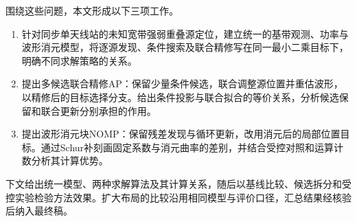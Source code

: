 围绕这些问题，本文形成以下三项工作。
\begin{enumerate}
  \item 针对同步单天线站的未知宽带强弱重叠源定位，建立统一的基带观测、功率与波形消元模型，将逐源发现、条件搜索及联合精修写在同一最小二乘目标下，明确不同求解策略的关系。
  \item 提出多候选联合精修AP：保留少量条件候选，联合调整源位置并重估波形，以精修后的目标选择分支。给出条件投影与联合拟合的等价关系，分析候选保留和联合更新分别承担的作用。
  \item 提出波形消元块NOMP：保留残差发现与循环更新，改用消元后的局部位置目标。通过Schur补刻画固定系数与消元曲率的差别，并结合受控对照和运算计数分析其计算优势。
\end{enumerate}

下文给出统一模型、两种求解算法及其计算关系，随后以基线比较、候选拆分和受控实验检验方法效果。扩大布局的比较沿用相同模型与评价口径，汇总结果经核验后纳入最终稿。
